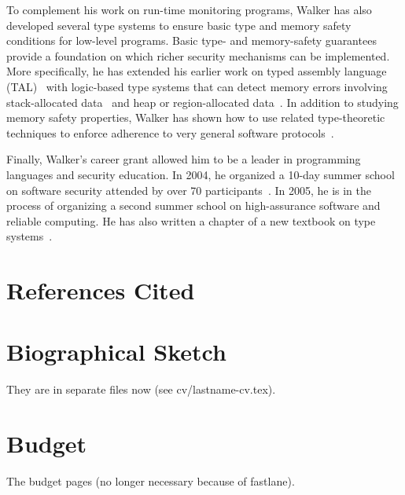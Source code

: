 \documentclass[11pt]{article}
\begin{document}
To complement his work on run-time monitoring programs, Walker has also
developed several type systems to ensure basic type and memory safety conditions
for low-level programs.  Basic type- and memory-safety guarantees provide a foundation on which
richer security mechanisms can be implemented.  More specifically, he
has extended his earlier work on typed assembly language (TAL)~\cite{morrisett+:tal,morrisett+:journal-stal} with
logic-based type systems that can detect memory errors involving
stack-allocated data~\cite{ahmed+:stack} and heap or region-allocated
data~\cite{ahmed+:hierarchical-storage}.  In addition to studying memory safety
properties, Walker has shown how to use related type-theoretic techniques
to enforce adherence to very general software
protocols~\cite{mandelbaum+:refinements}.  

Finally, Walker's career grant allowed him to be a leader in
programming languages and security education. In 2004, he organized
a 10-day summer school on software security 
attended by over 70 participants~\cite{summerschool04}.  In 2005, he is in the process of
organizing a second summer school on high-assurance software and reliable computing.  He has also written a
chapter of a new textbook on type systems~\cite{walker:attapl}.



\newpage
\section{References Cited}
{
 \small
} \newpage
\section{Biographical Sketch}
%

They are in separate files now (see cv/lastname-cv.tex).

\section{Budget}

The budget pages (no longer necessary because of fastlane). 

\end{document}
